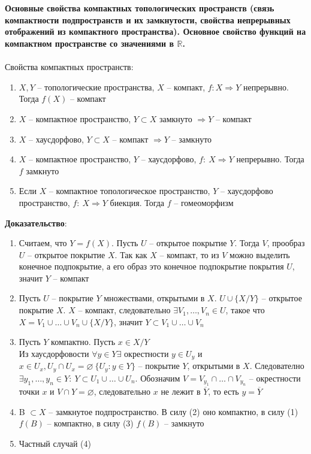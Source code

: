 \newpage
\section{}
	\textbf{Основные свойства компактных топологических пространств (связь компактности подпространств и их замкнутости, свойства непрерывных отображений из компактного пространства). Основное свойство функций на компактном пространстве со значениями в $\mathbb{R}$.}\\
	\\
	Свойства компактных пространств:\\
	\begin{enumerate}
		\item 
		$X,Y$ -- топологические пространства, $X$ -- компакт, $f: X\Rightarrow Y$ непрерывно. Тогда $f(X)$ -- компакт
		\item 
		$X$ -- компактное пространство, $Y \subset X$ замкнуто $\Rightarrow Y$ -- компакт
		\item 
		$X$ -- хаусдорфово, $Y \subset X$ -- компакт $\Rightarrow Y$ -- замкнуто
		\item 
		$X$ -- компактное пространство, $Y$ -- хаусдорфово, $f:\ X\Rightarrow Y$ непрерывно. Тогда $f$ замкнуто
		\item 
		Если $X$ -- компактное топологическое пространство, $Y$ -- хаусдорфово пространство, $f:\ X\Rightarrow Y$ биекция. Тогда $f$ -- гомеоморфизм
	\end{enumerate}
	\textbf{Доказательство}: 
	\begin{enumerate}
		\item 
		Считаем, что $Y = f(X)$. Пусть $U$ -- открытое покрытие $Y$. Тогда $V$, прообраз $U$ -- открытое покрытие $X$. Так как $X$ -- компакт, то из $V$ можно выделить конечное подпокрытие, а его образ это конечное подпокрытие покрытия $U$, значит $Y$ -- компакт
		\item 
		Пусть $U$ -- покрытие $Y$ множествами, открытыми в $X$. $U\cup \{X\slash Y\}$ -- открытое покрытие $X$. $X$ -- компакт, следовательно $\exists V_1,\ldots, V_n \in U$, такое что $X = V_1 \cup \ldots \cup V_n \cup \{X\slash Y\}$, значит $Y \subset V_1 \cup \ldots \cup V_n$
		\item 
		Пусть $Y$ компактно. Пусть $x\in X\slash Y$\\
		Из хаусдорфовости $\forall y\in Y \exists$ окрестности $y\in U_y$ и $x\in U_x, U_y\cap U_x = \varnothing\ \{U_y: y\in Y\}$ -- покрытие $Y$, открытыми в $X$. Следователно $\exists y_1,\ldots,y_n \in Y:\ Y\subset U_1 \cup \ldots \cup U_n$. Обозначим $V = V_{y_1} \cap \ldots \cap V_{y_n}$ -- окрестности точки $x$ и $V\cap Y = \varnothing$, следовательно $x$ не лежит в $\overline{Y}$, то есть $y = \overline{Y}$
		\item 
		B $\subset X$ -- замкнутое подпространство. В силу (2) оно компактно, в силу (1) $f(B)$ -- компактно, в силу (3) $f(B)$ -- замкнуто
		\item 
		Частный случай (4)
	\end{enumerate}
